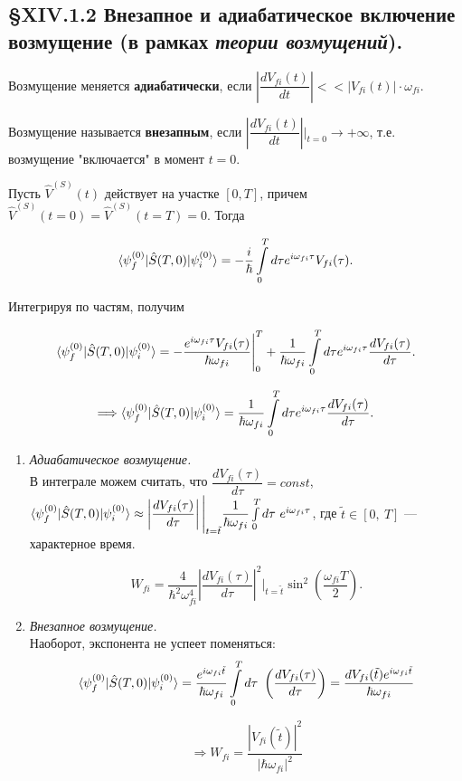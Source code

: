 \subsection{\S XIV.1.2 Внезапное и адиабатическое включение возмущение (в рамках \textit{теории возмущений}).}
\begin{definition}
	Возмущение меняется \textbf{адиабатически}, если $\left|\dfrac{d V_{fi}(t)}{dt}\right| << |V_{fi}(t)|\cdot \omega_{fi}$.
\end{definition}
\begin{definition}
	Возмущение называется \textbf{внезапным}, если $\left|\dfrac{d V_{fi}(t)}{dt}\right|\Bigg|_{t=0} \longrightarrow + \infty$, т.е. возмущение "включается" в момент $t = 0$.
\end{definition}

Пусть \(\hat{V}^{(S)}(t)\) действует на участке \([0, T]\), причем \(\hat{V}^{(S)}(t=0) = \hat{V}^{(S)}(t=T) = 0\). Тогда

\[
\langle \psi_f^{(0)} | \hat{S}(T, 0) | \psi_i^{(0)} \rangle = -\frac{i}{\hbar} \int\limits_0^T d\tau e^{i\omega_{fi}\tau} V_{fi}(\tau).
\]


Интегрируя по частям, получим

\[
\langle \psi_f^{(0)} | \hat{S}(T, 0) | \psi_i^{(0)} \rangle = -\frac{e^{i\omega_{fi}\tau} V_{fi}(\tau)}{\hbar \omega_{fi}} \Bigg|_0^T + \frac{1}{\hbar \omega_{fi}} \int\limits_0^T d\tau e^{i\omega_{fi}\tau} \frac{dV_{fi}(\tau)}{d\tau}.
\]

\[
\Longrightarrow \langle \psi_f^{(0)} | \hat{S}(T, 0) | \psi_i^{(0)} \rangle = \frac{1}{\hbar \omega_{fi}} \int\limits_0^T d\tau e^{i\omega_{fi}\tau} \frac{dV_{fi}(\tau)}{d\tau}.
\]
\begin{enumerate}
	\item \textit{Адиабатическое возмущение.}\\
	В интеграле можем считать, что \(\dfrac{dV_{fi}(\tau)}{d\tau} = const\),
	$\langle \psi_f^{(0)} | \hat{S}(T, 0) | \psi_i^{(0)} \rangle \approx \left|\dfrac{d V_{fi}(\tau)}{d\tau}\right|\Bigg|_{t=\tilde{t}}\dfrac{1}{\hbar \omega_{fi}} \int\limits_0^Td\tau~e^{i\omega_{fi}\tau}$, где $\tilde{t}\in[0,~T]$ --- характерное время.
	
	\[
	W_{fi} = \frac{4}{\hbar^2 \omega_{fi}^4} \left| \dfrac{dV_{fi}(\tau)}{d\tau} \right|^2\Bigg|_{t=\tilde{t}} \sin^2 \left( \frac{\omega_{fi} T}{2} \right).
	\]
	\item \textit{Внезапное возмущение.}\\
	Наоборот, экспонента не успеет поменяться:
	\[
	\langle \psi_f^{(0)} | \hat{S}(T, 0) | \psi_i^{(0)} \rangle = \dfrac{e^{i\omega_{fi}\tilde{t}}}{\hbar\omega_{fi}}\int\limits_0^Td\tau~\left(\dfrac{dV_{fi}(\tau)}{d\tau}\right) = \dfrac{dV_{fi}(\tilde{t})e^{i\omega_{fi}\tilde{t}}}{\hbar\omega_{fi}}
	\]
	
	\[
	\Longrightarrow W_{fi} = \dfrac{|V_{fi}(\tilde{t})|^2}{|\hbar\omega_{fi}|^2}
	\]
\end{enumerate}






